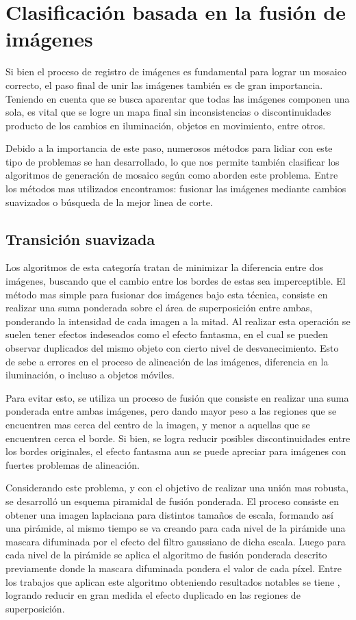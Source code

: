 \section*{Clasificación basada en la fusión de imágenes}

Si bien el proceso de registro de imágenes es fundamental para lograr un mosaico correcto, el paso final de unir las imágenes también es de gran importancia. Teniendo en cuenta que se busca aparentar que todas las imágenes componen una sola, es vital que se logre un mapa final sin inconsistencias o discontinuidades producto de los cambios en iluminación, objetos en movimiento, entre otros.

Debido a la importancia de este paso, numerosos métodos para lidiar con este tipo de problemas se han desarrollado, lo que nos permite también clasificar los algoritmos de generación de mosaico según como aborden este problema. Entre los métodos mas utilizados encontramos: fusionar las imágenes mediante cambios suavizados o búsqueda de la mejor linea de corte.

\subsection*{Transición suavizada}

Los algoritmos de esta categoría tratan de minimizar la diferencia entre dos imágenes, buscando que el cambio entre los bordes de estas sea imperceptible. El método mas simple para fusionar dos imágenes bajo esta técnica, consiste en realizar una suma ponderada sobre el área de superposición entre ambas, ponderando la intensidad de cada imagen a la mitad. Al realizar esta operación se suelen tener efectos indeseados como el efecto fantasma, en el cual se pueden observar duplicados del mismo objeto con cierto nivel de desvanecimiento. Esto de sebe a errores en el proceso de alineación de las imágenes, diferencia en la iluminación, o incluso a objetos móviles. 

Para evitar esto, se utiliza un proceso de fusión que consiste en realizar una suma ponderada entre ambas imágenes, pero dando mayor peso a las regiones que se encuentren mas cerca del centro de la imagen, y menor a aquellas que se encuentren cerca el borde. Si bien, se logra reducir posibles discontinuidades entre los bordes originales, el efecto fantasma aun se puede apreciar para imágenes con fuertes problemas de alineación.

Considerando este problema, y con el objetivo de realizar una unión mas robusta, se desarrolló un esquema piramidal de fusión ponderada. El proceso consiste en obtener una imagen laplaciana para distintos tamaños de escala, formando así una pirámide, al mismo tiempo se va creando para cada nivel de la pirámide una mascara difuminada por el efecto del filtro gaussiano de dicha escala. Luego para cada nivel de la pirámide se aplica el algoritmo de fusión ponderada descrito previamente donde la mascara  difuminada pondera el valor de cada píxel. Entre los trabajos que aplican este algoritmo obteniendo resultados notables se tiene \cite{multiband}, logrando reducir en gran medida el efecto duplicado en las regiones de superposición.

